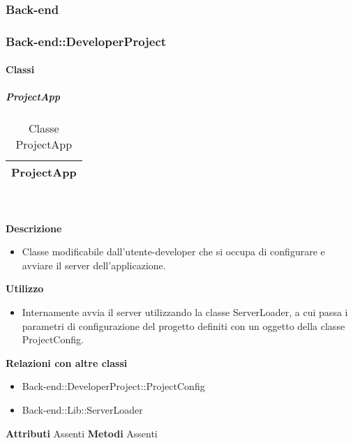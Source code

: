 
	\subsubsection{Back-end} 
	\subsubsection{Back-end::DeveloperProject} 
		\paragraph{Classi}
			\subparagraph{ProjectApp} 
\begin{table}[ht]
\begin{center}
\bgroup
	\setlength{\arrayrulewidth}{0.6mm}
	\def\arraystretch{1}
		\begin{tabular}{ | p{12cm} | }
				\hline  
					\centerline{\textbf{ProjectApp}}
		\\ \hline 
				\hline
				\hline
		
		\end{tabular}
\egroup
\caption{Classe ProjectApp}
\end{center}
\end{table} \textbf{\\ \\ Descrizione}
\begin{itemize}
\item[] Classe modificabile dall'utente-developer che si occupa di configurare e avviare il server dell'applicazione.
\end{itemize} 
\textbf{Utilizzo}
\begin{itemize}
\item[] Internamente avvia il server utilizzando la classe ServerLoader, a cui passa i parametri di configurazione del progetto definiti con un oggetto della classe ProjectConfig.
\end{itemize}
\textbf{Relazioni con altre classi}
\begin{itemize}
\item{Back-end::DeveloperProject::ProjectConfig}
\item{Back-end::Lib::ServerLoader}
\end{itemize}
\textbf{Attributi}
Assenti
\textbf{Metodi}
Assenti

